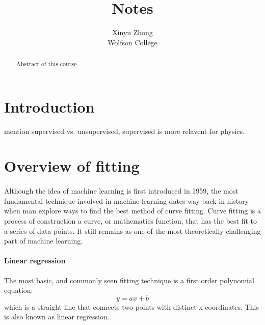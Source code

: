 \documentclass[12pt,a4paper]{article}
\author{Xinyu Zhong\\Wolfson College}
\title{Notes}
\begin{document}
\begin{titlepage}
    \maketitle
\end{titlepage}

\tableofcontents

\newpage

\begin{abstract}
\noindent
Abstract of this course
\end{abstract}
\section{Introduction}
mention supervised vs. unsupervised, supervised is more relavent for physics.
\section{Overview of fitting}
\paragraph*{}
Although the idea of machine learning is first introduced in 1959,
the most fundamental technique involved in machine learning dates way back in history when man explore ways to find the best method of curve fitting.
Curve fitting is a process of construction a curve, or mathematics function, that has the best fit to a series of data points. It still remains as one of the most theoretically challenging part of machine learning.
\paragraph{Linear regression}
The most basic, and commonly seen fitting technique is a first order polynomial equation:
\begin{equation}
    y=ax+b
\end{equation}
which is a straight line that connects two points with distinct x coordinates. This is also known as linear regression.
\end{document}
